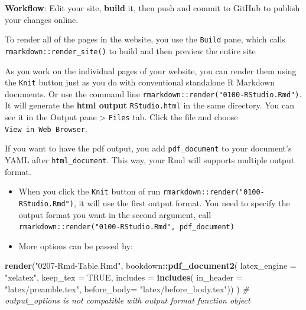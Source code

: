 \documentclass[
  a4paper,
  twoside,
  openright]{book}
\newenvironment{Shaded}{\begin{snugshade}}{\end{snugshade}}
\newcommand{\AttributeTok}[1]{\textcolor[rgb]{0.13,0.29,0.53}{#1}}
\newcommand{\CommentTok}[1]{\textcolor[rgb]{0.56,0.35,0.01}{\textit{#1}}}
\newcommand{\ConstantTok}[1]{\textcolor[rgb]{0.56,0.35,0.01}{#1}}
\newcommand{\FunctionTok}[1]{\textcolor[rgb]{0.13,0.29,0.53}{\textbf{#1}}}
\newcommand{\NormalTok}[1]{#1}
\newcommand{\SpecialCharTok}[1]{\textcolor[rgb]{0.81,0.36,0.00}{\textbf{#1}}}
\newcommand{\StringTok}[1]{\textcolor[rgb]{0.31,0.60,0.02}{#1}}
\providecommand{\tightlist}{%
  \setlength{\itemsep}{0pt}\setlength{\parskip}{0pt}}
\theoremstyle{definition}
\theoremstyle{definition}
\theoremstyle{definition}
\theoremstyle{definition}
\theoremstyle{remark}
\begin{document}
{\textbf{Workflow}}: Edit your site, \textbf{build} it, then push and commit to GitHub to publish your changes online.

To render {all of the pages} in the website, you use the \texttt{Build} pane, which calls \texttt{rmarkdown::render\_site()} to build and then preview the entire site

As you work on the {individual pages} of your website, you can render them using the \texttt{Knit} button just as you do with conventional standalone R Markdown documents. Or use the command line \texttt{rmarkdown::render("0100-RStudio.Rmd")}. It will generate the \textbf{html output} \texttt{RStudio.html} in the same directory. You can see it in the Output pane \textgreater{} \texttt{Files} tab. Click the file and choose \texttt{View\ in\ Web\ Browser}.

If you want to have the pdf output, you add \texttt{pdf\_document} to your document's YAML after \texttt{html\_document}. This way, your Rmd will supports multiple output format.

\begin{itemize}
\tightlist
\item
  When you click the \texttt{Knit} button of run \texttt{rmarkdown::render("0100-RStudio.Rmd")}, it will use the first output format. You need to specify the output format you want in the second argument, call \texttt{rmarkdown::render("0100-RStudio.Rmd",\ \textquotesingle{}pdf\_document\textquotesingle{})}
\item
  More options can be passed by:
\end{itemize}

\begin{Shaded}
\begin{Highlighting}[]
\FunctionTok{render}\NormalTok{(}\StringTok{"0207{-}Rmd{-}Table.Rmd"}\NormalTok{, }
\NormalTok{bookdown}\SpecialCharTok{::}\FunctionTok{pdf\_document2}\NormalTok{(}
    \AttributeTok{latex\_engine =} \StringTok{"xelatex"}\NormalTok{,}
    \AttributeTok{keep\_tex =} \ConstantTok{TRUE}\NormalTok{,}
    \AttributeTok{includes =} \FunctionTok{includes}\NormalTok{(}
       \AttributeTok{in\_header =} \StringTok{"latex/preamble.tex"}\NormalTok{,}
       \AttributeTok{before\_body=} \StringTok{"latex/before\_body.tex"}\NormalTok{))}
\NormalTok{    )}
\CommentTok{\# \textasciigrave{}output\_options\textasciigrave{} is not compatible with output format function object}
\end{Highlighting}
\end{Shaded}
\end{document}
